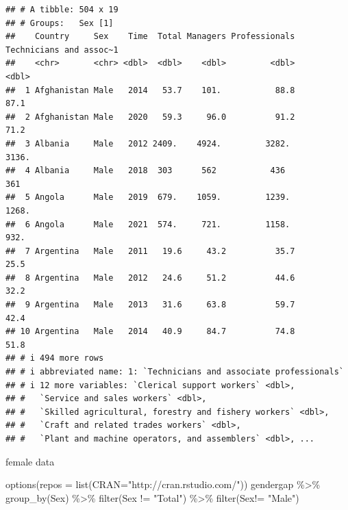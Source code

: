 \documentclass[
]{article}
\newenvironment{Shaded}{\begin{snugshade}}{\end{snugshade}}
\newcommand{\AttributeTok}[1]{\textcolor[rgb]{0.77,0.63,0.00}{#1}}
\newcommand{\FunctionTok}[1]{\textcolor[rgb]{0.00,0.00,0.00}{#1}}
\newcommand{\NormalTok}[1]{#1}
\newcommand{\SpecialCharTok}[1]{\textcolor[rgb]{0.00,0.00,0.00}{#1}}
\newcommand{\StringTok}[1]{\textcolor[rgb]{0.31,0.60,0.02}{#1}}
\begin{document}
\begin{verbatim}
## # A tibble: 504 x 19
## # Groups:   Sex [1]
##    Country     Sex    Time  Total Managers Professionals Technicians and assoc~1
##    <chr>       <chr> <dbl>  <dbl>    <dbl>         <dbl>                   <dbl>
##  1 Afghanistan Male   2014   53.7    101.           88.8                    87.1
##  2 Afghanistan Male   2020   59.3     96.0          91.2                    71.2
##  3 Albania     Male   2012 2409.    4924.         3282.                   3136. 
##  4 Albania     Male   2018  303      562           436                     361  
##  5 Angola      Male   2019  679.    1059.         1239.                   1268. 
##  6 Angola      Male   2021  574.     721.         1158.                    932. 
##  7 Argentina   Male   2011   19.6     43.2          35.7                    25.5
##  8 Argentina   Male   2012   24.6     51.2          44.6                    32.2
##  9 Argentina   Male   2013   31.6     63.8          59.7                    42.4
## 10 Argentina   Male   2014   40.9     84.7          74.8                    51.8
## # i 494 more rows
## # i abbreviated name: 1: `Technicians and associate professionals`
## # i 12 more variables: `Clerical support workers` <dbl>,
## #   `Service and sales workers` <dbl>,
## #   `Skilled agricultural, forestry and fishery workers` <dbl>,
## #   `Craft and related trades workers` <dbl>,
## #   `Plant and machine operators, and assemblers` <dbl>, ...
\end{verbatim}

female data

\begin{Shaded}
\begin{Highlighting}[]
\FunctionTok{options}\NormalTok{(}\AttributeTok{repos =} \FunctionTok{list}\NormalTok{(}\AttributeTok{CRAN=}\StringTok{"http://cran.rstudio.com/"}\NormalTok{))}
\NormalTok{gendergap }\SpecialCharTok{\%\textgreater{}\%}
\FunctionTok{group\_by}\NormalTok{(Sex) }\SpecialCharTok{\%\textgreater{}\%}
  \FunctionTok{filter}\NormalTok{(Sex }\SpecialCharTok{!=} \StringTok{"Total"}\NormalTok{) }\SpecialCharTok{\%\textgreater{}\%}
\FunctionTok{filter}\NormalTok{(Sex}\SpecialCharTok{!=} \StringTok{"Male"}\NormalTok{)}
\end{Highlighting}
\end{Shaded}
\end{document}
